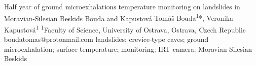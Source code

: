 
\abstract
{Half year of ground microexhalations temperature monitoring on landslides in Moravian-Silesian Beskids} 
{Bouda and Kapustová} 
{Tomáš Bouda\textsuperscript{1}*, Veronika Kapustová\textsuperscript{1}} 
{\POtag} 
{
\textsuperscript{1}Faculty of Science, University of Ostrava, Ostrava, Czech Republic
}
{boudatomas@protonmail.com}  %
{landslides; crevice-type caves; ground microexhalation; surface temperature; monitoring; IRT camera; Moravian-Silesian Beskids}
